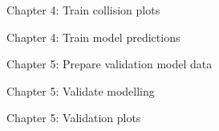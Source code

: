 %

\vspace{.5cm}
\noindent Chapter 4: Train collision plots

%

\vspace{.5cm}
\noindent Chapter 4: Train model predictions

%


\vspace{.5cm}
\noindent Chapter 5: Prepare validation model data

%

\vspace{.5cm}
\noindent Chapter 5: Validate modelling

%

\vspace{.5cm}
\noindent Chapter 5: Validation plots

%